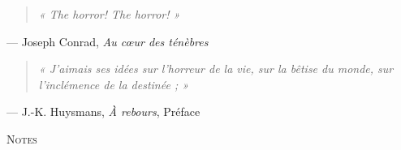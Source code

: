 \documentclass[12pt,twoside,openright]{memoir}
\makeatletter
\renewcommand{\cleardoublepage}{%
  \clearpage
  \if@twoside
    \ifodd\c@page\else
      \hbox{}\thispagestyle{empty}\newpage
    \fi
  \fi
}
\makeatother
\begin{document}
\vspace{2\onelineskip}

\cleardoublepage                        %

\thispagestyle{empty}
\vspace*{\fill}

\begin{quote}
\itshape « The horror! The horror! »
\end{quote}
\begin{flushright}
\normalfont — Joseph Conrad, \textit{Au cœur des ténèbres}
\end{flushright}

\vspace{3\onelineskip}

\begin{quote}
\itshape « J'aimais ses idées sur l'horreur de la vie, sur la bêtise du monde, sur l'inclémence de la destinée ; »
\end{quote}
\begin{flushright}
\normalfont — J.-K. Huysmans, \textit{À rebours}, Préface
\end{flushright}

\vspace*{\fill}

\cleardoublepage                        %

\pagestyle{gallimard}

{\makeatletter\def\contentsline#1#2#3#4{}\makeatother}



\ifdefined\AVECNOTES
  \ifdefined\SANSNOTESFINALES\else
    \cleardoublepage                            %
    \thispagestyle{empty}
    \vspace*{10\onelineskip}
    {\centering\normalfont\scshape\large Notes\par}
    \newpage                                    %
    \hbox{}\thispagestyle{empty}
    \newpage                                    %
    \pagestyle{gallimard}
    \theendnotes
  \fi
\fi


\end{document}
